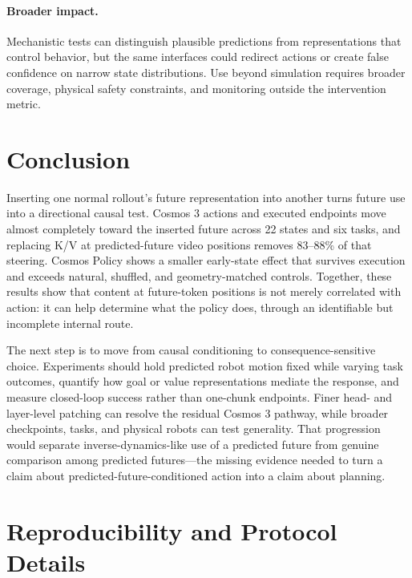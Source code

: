 \documentclass{article}
\begin{document}
\paragraph{Broader impact.}
Mechanistic tests can distinguish plausible predictions from representations that control behavior, but the same interfaces could redirect actions or create false confidence on narrow state distributions. Use beyond simulation requires broader coverage, physical safety constraints, and monitoring outside the intervention metric.

\section{Conclusion}

Inserting one normal rollout's future representation into another turns future use into a directional causal test. Cosmos 3 actions and executed endpoints move almost completely toward the inserted future across 22 states and six tasks, and replacing K/V at predicted-future video positions removes 83--88\% of that steering. Cosmos Policy shows a smaller early-state effect that survives execution and exceeds natural, shuffled, and geometry-matched controls. Together, these results show that content at future-token positions is not merely correlated with action: it can help determine what the policy does, through an identifiable but incomplete internal route.

The next step is to move from causal conditioning to consequence-sensitive choice. Experiments should hold predicted robot motion fixed while varying task outcomes, quantify how goal or value representations mediate the response, and measure closed-loop success rather than one-chunk endpoints. Finer head- and layer-level patching can resolve the residual Cosmos 3 pathway, while broader checkpoints, tasks, and physical robots can test generality. That progression would separate inverse-dynamics-like use of a predicted future from genuine comparison among predicted futures---the missing evidence needed to turn a claim about predicted-future-conditioned action into a claim about planning.

\fi

{\small


}

\appendix

\section{Reproducibility and Protocol Details}
\label{app:reproducibility}
\end{document}

